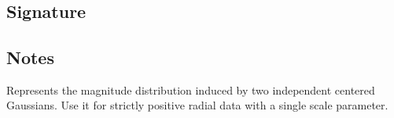 \documentclass[letterpaper,10pt,english]{sphinxmanual}
\begin{document}
\section{}
\label{\detokenize{object_api_reference:rayleigh}}

\subsection{Signature}
\label{\detokenize{object_api_reference:id40}}
\begin{sphinxVerbatim}[commandchars=\\\{\}]

\end{sphinxVerbatim}


\subsection{Notes}
\label{\detokenize{object_api_reference:id41}}
\sphinxAtStartPar
Represents the magnitude distribution induced by two independent centered Gaussians. Use it for strictly positive radial data with a single scale parameter.
\end{document}
